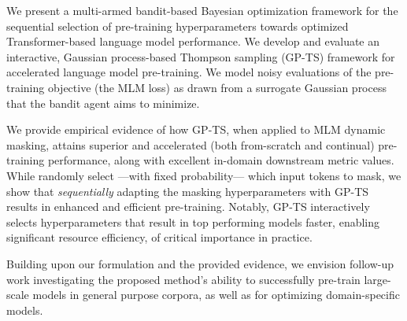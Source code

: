 We present a multi-armed bandit-based Bayesian optimization framework for the sequential selection of pre-training hyperparameters
towards optimized Transformer-based language model performance.
%
We develop and evaluate an interactive, Gaussian process-based Thompson sampling (GP-TS) framework
for accelerated language model pre-training. %
We model noisy evaluations of the pre-training objective (\eg the MLM loss) as drawn from a surrogate Gaussian process that the bandit agent aims to minimize.

We provide empirical evidence of how GP-TS,
when applied to MLM dynamic masking,
attains superior and accelerated (both from-scratch and continual) pre-training performance,
along with excellent in-domain downstream metric values.
%
While \citet{roberta} randomly select ---with fixed probability---
which input tokens to mask,
we show that \textit{sequentially} adapting the masking hyperparameters with GP-TS results in enhanced and efficient pre-training.
Notably, GP-TS interactively selects hyperparameters that result in top performing models faster,
enabling significant resource efficiency, of critical importance in practice.

Building upon our formulation and the provided evidence,
we envision follow-up work investigating the proposed method's ability 
to successfully pre-train large-scale models in general purpose corpora,
as well as for optimizing domain-specific models.
